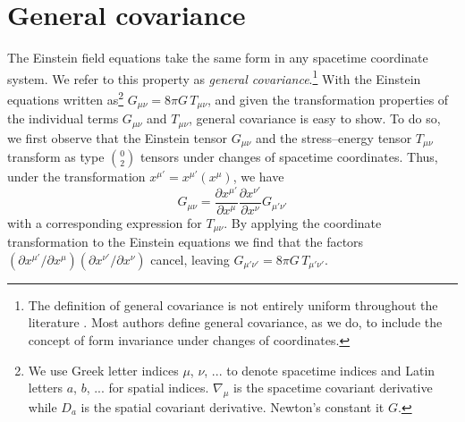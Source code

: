 \documentclass[letterpaper,nofootinbib,prd,amsmath,onecolumn]{revtex4-1}
\begin{document}


\section{General covariance}\label{covariance}
The Einstein field equations take the same 
form in any spacetime coordinate system. We refer to this property as {\em general covariance}.\footnote{The definition of 
general covariance is not entirely uniform throughout the literature \cite{Weinberg:GRbook,Misner:1974qy,Wald:GRbook,Lambourne:GRbook}. Most authors 
define general covariance, as we do, to include the concept of form invariance under changes of coordinates.} 
With the Einstein equations written as\footnote{We use Greek letter indices $\mu$, $\nu$, ... to denote spacetime indices and Latin 
letters $a$, $b$, ... for spatial indices. $\nabla_{\mu}$ is the spacetime covariant derivative while $D_{a}$ is the spatial 
covariant derivative. Newton's constant it $G$.} $G_{\mu\nu} = 8\pi G\, T_{\mu\nu}$, and given the transformation properties 
of the individual terms $G_{\mu\nu}$ and $T_{\mu\nu}$, general covariance is easy to show. To do so, we first observe that 
the Einstein tensor $G_{\mu\nu}$ and the stress--energy tensor $T_{\mu\nu}$ transform as type $0\choose 2$ tensors under changes 
of spacetime coordinates. Thus, under the  
transformation $x^{\mu'} = x^{\mu'}(x^\mu)$, we have
\begin{equation}
	G_{\mu\nu} = \frac{\partial x^{\mu'}}{\partial x^{\mu}} \frac{\partial x^{\nu'}}{\partial x^{\nu}} G_{\mu'\nu'} 
\end{equation}
with a corresponding expression for $T_{\mu\nu}$. By applying the coordinate transformation 
to the Einstein equations we find that the factors 
$(\partial x^{\mu'}/\partial x^{\mu}) (\partial x^{\nu'}/\partial x^{\nu})$
cancel, leaving $G_{\mu'\nu'} = 8\pi G\, T_{\mu'\nu'}$. 
\end{document}
